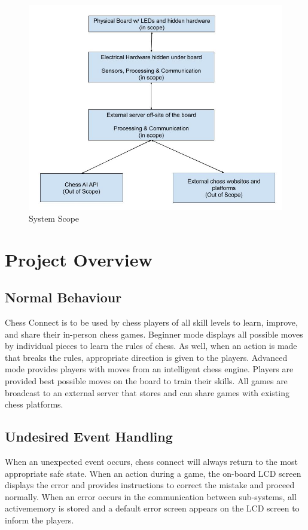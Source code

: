 \documentclass[12pt, titlepage]{article}
\begin{document}
\begin{figure}[H]
  \begin{center}
    \includegraphics[scale=0.45]{scope.jpg}
    \caption{System Scope}
    \label{Fig_Scope} 
  \end{center}
\end{figure}

\section{Project Overview}

\subsection{Normal Behaviour}
Chess Connect is to be used by chess players of all skill levels to learn, improve,
and share their in-person chess games. Beginner mode displays all possible moves
by individual pieces to learn the rules of chess. As well, when an action is made
that breaks the rules, appropriate direction is given to the players. Advanced mode
provides players with moves from an intelligent chess engine. Players are provided
best possible moves on the board to train their skills. All games are broadcast to
an external server that stores and can share games with existing chess platforms.

\subsection{Undesired Event Handling}
When an unexpected event occurs, chess connect will always return to the most 
appropriate safe state. When an action during a game, the on-board LCD screen 
displays the error and provides instructions to correct the mistake and proceed 
normally. When an error occurs in the communication between sub-systems, all 
activememory is stored and a default error screen appears on the LCD screen to 
inform the players.
\end{document}
